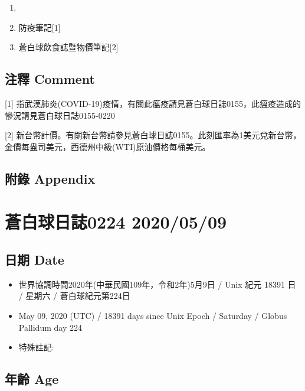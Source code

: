 \documentclass[
]{article}
\providecommand{\tightlist}{%
  \setlength{\itemsep}{0pt}\setlength{\parskip}{0pt}}
\begin{document}
\begin{enumerate}
\def\labelenumi{\arabic{enumi}.}
\item
\item
  防疫筆記{[}1{]}
\item
  蒼白球飲食誌暨物價筆記{[}2{]}
\end{enumerate}

\hypertarget{ux6ce8ux91cb-comment-7}{%
\subsection{注釋 Comment}\label{ux6ce8ux91cb-comment-7}}

{[}1{]}
指武漢肺炎(COVID-19)疫情，有關此瘟疫請見蒼白球日誌0155，此瘟疫造成的慘況請見蒼白球日誌0155-0220

{[}2{]}
新台幣計價。有關新台幣請參見蒼白球日誌0155。此刻匯率為1美元兌新台幣，金價每盎司美元，西德州中級(WTI)原油價格每桶美元。

\hypertarget{ux9644ux9304-appendix-7}{%
\subsection{附錄 Appendix}\label{ux9644ux9304-appendix-7}}

\hypertarget{ux84bcux767dux7403ux65e5ux8a8c0224-20200509}{%
\section{蒼白球日誌0224
2020/05/09}\label{ux84bcux767dux7403ux65e5ux8a8c0224-20200509}}

\hypertarget{ux65e5ux671f-date-8}{%
\subsection{日期 Date}\label{ux65e5ux671f-date-8}}

\begin{itemize}
\tightlist
\item
  世界協調時間2020年(中華民國109年，令和2年)5月9日 / Unix 紀元 18391 日
  / 星期六 / 蒼白球紀元第224日
\item
  May 09, 2020 (UTC) / 18391 days since Unix Epoch / Saturday / Globus
  Pallidum day 224
\item
  特殊註記:
\end{itemize}

\hypertarget{ux5e74ux9f61-age-8}{%
\subsection{年齡 Age}\label{ux5e74ux9f61-age-8}}
\end{document}
